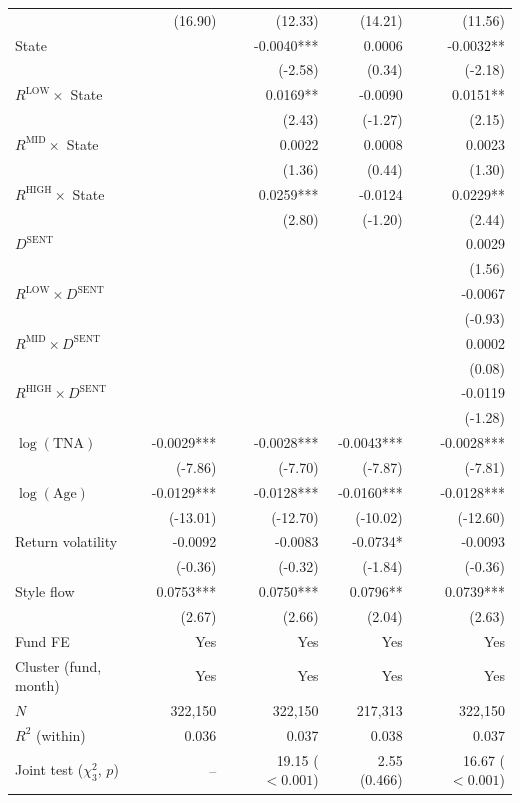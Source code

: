 \begin{table}[!htbp]
{\begin{tabular*}{\linewidth}{@{\extracolsep{\fill}}lrrrr}
 & (16.90) & (12.33) & (14.21) & (11.56)\\
State &  & -0.0040*** & 0.0006 & -0.0032**\\
 &  & (-2.58) & (0.34) & (-2.18)\\
$R^{\text{LOW}}\times$ State &  & 0.0169** & -0.0090 & 0.0151**\\
 &  & (2.43) & (-1.27) & (2.15)\\
$R^{\text{MID}}\times$ State &  & 0.0022 & 0.0008 & 0.0023\\
 &  & (1.36) & (0.44) & (1.30)\\
$R^{\text{HIGH}}\times$ State &  & 0.0259*** & -0.0124 & 0.0229**\\
 &  & (2.80) & (-1.20) & (2.44)\\
$D^{\text{SENT}}$ &  &  &  & 0.0029\\
 &  &  &  & (1.56)\\
$R^{\text{LOW}}\times D^{\text{SENT}}$ &  &  &  & -0.0067\\
 &  &  &  & (-0.93)\\
$R^{\text{MID}}\times D^{\text{SENT}}$ &  &  &  & 0.0002\\
 &  &  &  & (0.08)\\
$R^{\text{HIGH}}\times D^{\text{SENT}}$ &  &  &  & -0.0119\\
 &  &  &  & (-1.28)\\
$\log(\text{TNA})$ & -0.0029*** & -0.0028*** & -0.0043*** & -0.0028***\\
 & (-7.86) & (-7.70) & (-7.87) & (-7.81)\\
$\log(\text{Age})$ & -0.0129*** & -0.0128*** & -0.0160*** & -0.0128***\\
 & (-13.01) & (-12.70) & (-10.02) & (-12.60)\\
Return volatility & -0.0092 & -0.0083 & -0.0734* & -0.0093\\
 & (-0.36) & (-0.32) & (-1.84) & (-0.36)\\
Style flow & 0.0753*** & 0.0750*** & 0.0796** & 0.0739***\\
 & (2.67) & (2.66) & (2.04) & (2.63)\\
\midrule
Fund FE & Yes & Yes & Yes & Yes\\
Cluster (fund, month) & Yes & Yes & Yes & Yes\\
$N$ & 322,150 & 322,150 & 217,313 & 322,150\\
$R^2$ (within) & 0.036 & 0.037 & 0.038 & 0.037\\
Joint test ($\chi^2_3$, $p$) & -- & 19.15 ($<0.001$) & 2.55 (0.466) & 16.67 ($<0.001$)\\

\end{tabular*}}
\end{table}
